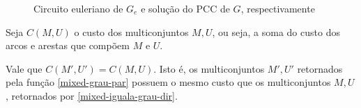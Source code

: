 \begin{figure}
\begin{minipage}{.5\textwidth}
        \end{minipage}
        \caption{Circuito euleriano de $G_e$ e solução do PCC de $G$, respectivamente}
        \label{fig:mixed-ex-sol}
    \end{figure}

    \begin{lemma}
        \label{mixed-custo-igual}
        Seja $C(M,U)$ o custo dos multiconjuntos $M,U$, ou seja, a soma do custo dos arcos e arestas que compõem $M$ e $U$.

        Vale que $C(M', U') = C(M, U)$. 
        Isto é, os multiconjuntos $M', U'$ retornados pela função \ref{mixed-grau-par} possuem o mesmo custo que os multiconjuntos $M, U$, retornados por \ref{mixed-iguala-grau-dir}.
    \end{lemma}

